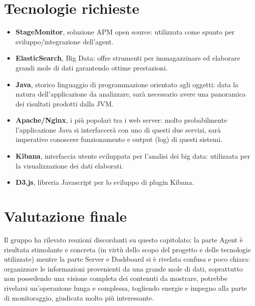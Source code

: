 \documentclass[StudioDiFattibilità.tex]{subfiles}
\begin{document}
\section{Tecnologie richieste}
\begin{itemize}
	\item \textbf{StageMonitor}, soluzione APM open source: utilizzata come spunto per sviluppo/integrazione dell'agent.
	\item \textbf{ElasticSearch},  Big Data: offre strumenti per immagazzinare ed elaborare grandi mole di dati garantendo ottime prestazioni.
	\item \textbf{Java}, storico linguaggio di programmazione orientato agli oggetti: data la natura dell'applicazione da analizzare, sarà necessario avere una panoramica dei risultati prodotti dalla JVM.
	\item \textbf{Apache/Nginx}, i più popolari tra i web server: molto probabilmente l'applicazione Java si interfaccerà con uno di questi due servizi, sarà imperativo conoscere funzionamento e output (log) di questi sistemi. 
	\item \textbf{Kibana}, interfaccia utente sviluppata per l'analisi dei big data: utilizzata per la visualizzazione dei dati elaborati.
	\item \textbf{D3.js}, libreria Javascript per lo sviluppo di plugin Kibana.
\end{itemize}
\section{Valutazione finale}
Il gruppo ha rilevato reazioni discordanti su questo capitolato: la parte Agent è risultata stimolante e concreta (in virtù dello scopo del progetto e delle tecnologie utilizzate) mentre la parte Server e Dashboard si è rivelata confusa e poco chiara: organizzare le informazioni provenienti da una grande mole di dati, soprattutto non possedendo una visione completa dei contenuti da mostrare, potrebbe rivelarsi un'operazione lunga e complessa, togliendo energie e impegno alla parte di monitoraggio, giudicata molto più interessante.  
\end{document}
